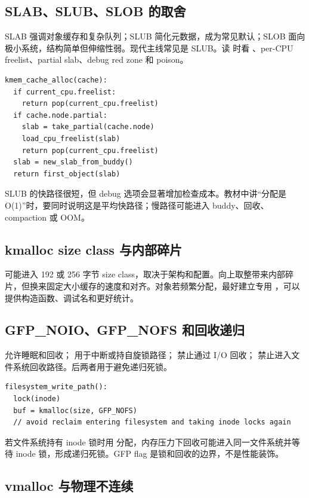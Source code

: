 \subsection{SLAB、SLUB、SLOB 的取舍}

SLAB 强调对象缓存和复杂队列；SLUB 简化元数据，成为常见默认；SLOB 面向极小系统，结构简单但伸缩性弱。现代主线常见是 SLUB。读  时看 、per-CPU freelist、partial slab、debug red zone 和 poison。

\begin{lstlisting}
kmem_cache_alloc(cache):
  if current_cpu.freelist:
    return pop(current_cpu.freelist)
  if cache.node.partial:
    slab = take_partial(cache.node)
    load_cpu_freelist(slab)
    return pop(current_cpu.freelist)
  slab = new_slab_from_buddy()
  return first_object(slab)
\end{lstlisting}

SLUB 的快路径很短，但 debug 选项会显著增加检查成本。教材中讲“分配是 O(1)”时，要同时说明这是平均快路径；慢路径可能进入 buddy、回收、compaction 或 OOM。

\subsection{kmalloc size class 与内部碎片}

 可能进入 192 或 256 字节 size class，取决于架构和配置。向上取整带来内部碎片，但换来固定大小缓存的速度和对齐。对象若频繁分配，最好建立专用 ，可以提供构造函数、调试名和更好统计。

\subsection{GFP\_NOIO、GFP\_NOFS 和回收递归}

 允许睡眠和回收； 用于中断或持自旋锁路径； 禁止通过 I/O 回收； 禁止进入文件系统回收路径。后两者用于避免递归死锁。

\begin{lstlisting}
filesystem_write_path():
  lock(inode)
  buf = kmalloc(size, GFP_NOFS)
  // avoid reclaim entering filesystem and taking inode locks again
\end{lstlisting}

若文件系统持有 inode 锁时用  分配，内存压力下回收可能进入同一文件系统并等待 inode 锁，形成递归死锁。GFP flag 是锁和回收的边界，不是性能装饰。

\subsection{vmalloc 与物理不连续}

